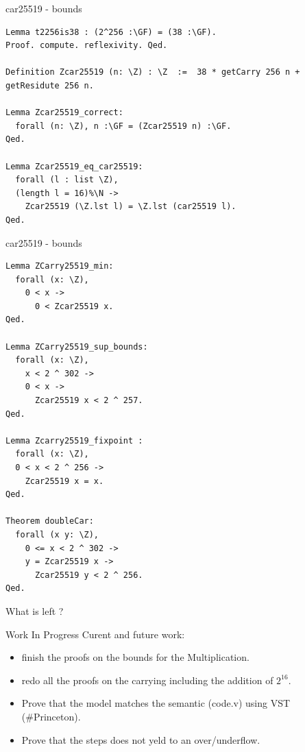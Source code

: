 \documentclass[8pt]{beamer}
\begin{document}
%
%

\begin{frame}[fragile]{car25519 - bounds}
  \begin{center}
\begin{lstlisting}[language=Coq, caption=car25519, label=cod:languageC181]
Lemma t2256is38 : (2^256 :\GF) = (38 :\GF).
Proof. compute. reflexivity. Qed.

Definition Zcar25519 (n: \Z) : \Z  :=  38 * getCarry 256 n +  getResidute 256 n.

Lemma Zcar25519_correct:
  forall (n: \Z), n :\GF = (Zcar25519 n) :\GF.
Qed.

Lemma Zcar25519_eq_car25519:
  forall (l : list \Z),
  (length l = 16)%\N ->
    Zcar25519 (\Z.lst l) = \Z.lst (car25519 l).
Qed.
\end{lstlisting}

  \end{center}
\end{frame}


%
%

\begin{frame}[fragile]{car25519 - bounds}
  \begin{center}
\begin{lstlisting}[language=Coq, caption=car25519, label=cod:languageC191]
Lemma ZCarry25519_min:
  forall (x: \Z),
    0 < x ->
      0 < Zcar25519 x.
Qed.

Lemma ZCarry25519_sup_bounds:
  forall (x: \Z),
    x < 2 ^ 302 ->
    0 < x ->
      Zcar25519 x < 2 ^ 257.
Qed.

Lemma Zcarry25519_fixpoint :
  forall (x: \Z),
  0 < x < 2 ^ 256 ->
    Zcar25519 x = x.
Qed.

Theorem doubleCar:
  forall (x y: \Z),
    0 <= x < 2 ^ 302 ->
    y = Zcar25519 x ->
      Zcar25519 y < 2 ^ 256.
Qed.
\end{lstlisting}

  \end{center}
\end{frame}

\begin{frame}[standout]
  \Huge What is left ?
\end{frame}

\begin{frame}[fragile]{Work In Progress}
    Curent and future work:
    \begin{itemize}
      \item finish the proofs on the bounds for the Multiplication.
      \item redo all the proofs on the carrying including the addition of $2^{16}$.
      \item Prove that the model matches the semantic (code.v) using VST (\#Princeton).
      \item Prove that the steps does not yeld to an over/underflow.
    \end{itemize}
\end{frame}
\end{document}
